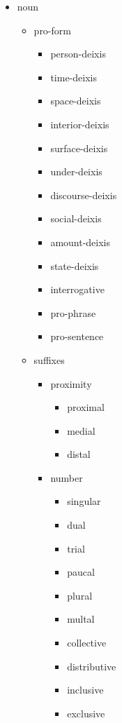 \begin{table}
\begin{multicols}{2}
\begin{itemize}
\item noun
    \begin{itemize}
        \item pro-form
            \begin{itemize}
                \item person-deixis
                \item time-deixis
                \item space-deixis
                \item interior-deixis
                \item surface-deixis
                \item under-deixis
                \item discourse-deixis
                \item social-deixis
                \item amount-deixis
                \item state-deixis
                \item interrogative
                \item pro-phrase
                \item pro-sentence
            \end{itemize}
        
        \item suffixes
            \begin{itemize}
                \item proximity
                    \begin{itemize}
                        \item proximal
                        \item medial
                        \item distal
                    \end{itemize}
                
                \item number
                    \begin{itemize}
                        \item singular
                        \item dual
                        \item trial
                        \item paucal
                        \item plural
                        \item multal
                        \item collective
                        \item distributive
                        \item inclusive
                        \item exclusive
                    \end{itemize}
                

\end{itemize}
\end{itemize}
\end{itemize}
\end{multicols}
\end{table}
